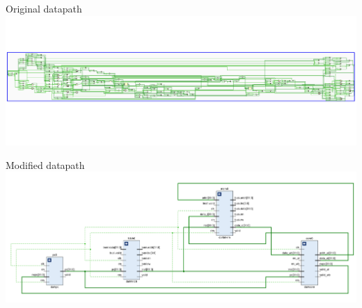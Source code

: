 \begin{frame}{Original datapath}
    \includegraphics[width=\linewidth]{images/darkriscv_nomeu.PNG}
\end{frame}

\begin{frame}{Modified datapath}
    \includegraphics[width=\linewidth]{images/datapath_meu.PNG}
\end{frame}
